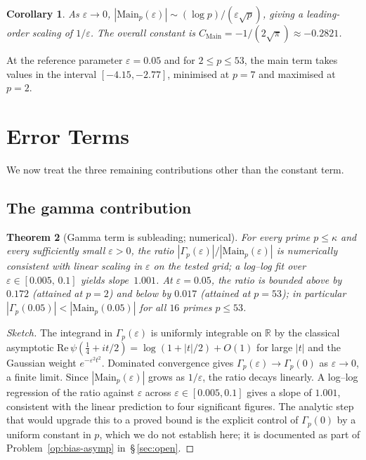 \documentclass[11pt]{article}
\newtheorem{theorem}{Theorem}[section]
\newtheorem{corollary}[theorem]{Corollary}
\begin{document}
\begin{corollary}
\label{cor:main-scaling}
As $\varepsilon\to 0$, $|\mathrm{Main}_p(\varepsilon)|\sim
(\log p)/(\varepsilon\sqrt p)$, giving a leading-order scaling of
$1/\varepsilon$.
The overall constant is $C_{\mathrm{Main}}=-1/(2\sqrt\pi)\approx-0.2821$.
\end{corollary}

At the reference parameter $\varepsilon=0.05$ and for $2\le p\le 53$,
the main term takes values in the interval $[-4.15,-2.77]$, minimised
at $p=7$ and maximised at $p=2$.

\section{Error Terms}
\label{sec:errors}

We now treat the three remaining contributions other than the constant
term.

\subsection{The gamma contribution}

\begin{theorem}[Gamma term is subleading; numerical]
\label{thm:gamma}
For every prime $p\le\kappa$ and every sufficiently small
$\varepsilon>0$, the ratio
$|\Gamma_p(\varepsilon)|/|\mathrm{Main}_p(\varepsilon)|$
is numerically consistent with linear scaling in $\varepsilon$ on the
tested grid; a log--log fit over
$\varepsilon\in[0.005,\,0.1]$ yields slope~$1.001$.
At $\varepsilon=0.05$, the ratio is bounded above by $0.172$ (attained
at $p=2$) and below by $0.017$ (attained at $p=53$); in particular
$|\Gamma_p(0.05)|<|\mathrm{Main}_p(0.05)|$ for all $16$ primes $p\le 53$.
\end{theorem}

\begin{proof}[Sketch]
The integrand in $\Gamma_p(\varepsilon)$ is uniformly integrable on
$\mathbb R$ by the classical asymptotic
$\mathrm{Re}\,\psi(\tfrac14+it/2)=\log(1+|t|/2)+O(1)$ for large $|t|$
and the Gaussian weight $e^{-\varepsilon^2 t^2}$.
Dominated convergence gives $\Gamma_p(\varepsilon)\to\Gamma_p(0)$ as
$\varepsilon\to 0$, a finite limit.
Since $|\mathrm{Main}_p(\varepsilon)|$ grows as $1/\varepsilon$, the
ratio decays linearly.
A log--log regression of the ratio against $\varepsilon$ across
$\varepsilon\in[0.005,0.1]$ gives a slope of $1.001$, consistent with
the linear prediction to four significant figures.
The analytic step that would upgrade this to a proved bound is the
explicit control of $\Gamma_p(0)$ by a uniform constant in $p$, which
we do not establish here; it is documented as part of
Problem~\ref{op:bias-asymp} in~\S\,\ref{sec:open}.
\end{proof}
\end{document}
